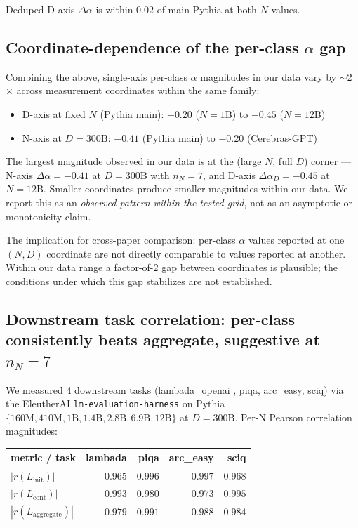 \documentclass[10pt]{article}
\newcommand{\dalpha}{\Delta\alpha}
\newcommand{\Linit}{L_\mathrm{init}}
\newcommand{\Lcont}{L_\mathrm{cont}}
\newcommand{\Lagg}{L_\mathrm{aggregate}}
\begin{document}
Deduped D-axis $\dalpha$ is within $0.02$ of main Pythia at both $N$
values.

\subsection{Coordinate-dependence of the per-class $\alpha$ gap}
\label{sec:coord}

Combining the above, single-axis per-class $\alpha$ magnitudes in our
data vary by $\sim$2$\times$ across measurement coordinates within
the same family:
\begin{itemize}
  \item D-axis at fixed $N$ (Pythia main): $-0.20$ ($N{=}1\text{B}$)
        to $-0.45$ ($N{=}12\text{B}$)
  \item N-axis at $D{=}300\text{B}$: $-0.41$ (Pythia main) to $-0.20$
        (Cerebras-GPT)
\end{itemize}
The largest magnitude observed in our data is at the (large $N$, full
$D$) corner --- N-axis $\dalpha = -0.41$ at $D{=}300\text{B}$ with
$n_N = 7$, and D-axis $\dalpha_D = -0.45$ at $N = 12\text{B}$.
Smaller coordinates produce smaller magnitudes within our data. We
report this as an \emph{observed pattern within the tested grid},
not as an asymptotic or monotonicity claim.

The implication for cross-paper comparison: per-class $\alpha$ values
reported at one $(N, D)$ coordinate are not directly comparable to
values reported at another. Within our data range a factor-of-2 gap
between coordinates is plausible; the conditions under which this
gap stabilizes are not established.

\subsection{Downstream task correlation: per-class consistently beats aggregate, suggestive at $n_N{=}7$}
\label{sec:downstream}

We measured 4 downstream tasks (lambada\_openai
\citep{paperno2016lambada}, piqa, arc\_easy, sciq) via the EleutherAI
\texttt{lm-evaluation-harness} \citep{gao2024lmeval} on Pythia
$\{160\text{M}, 410\text{M}, 1\text{B}, 1.4\text{B}, 2.8\text{B},
6.9\text{B}, 12\text{B}\}$ at $D{=}300\text{B}$. Per-N Pearson
correlation magnitudes:

\begin{center}
\small
\begin{tabular}{lrrrr}
\toprule
metric / task & lambada & piqa & arc\_easy & sciq \\
\midrule
$|r(\Linit)|$  & $0.965$ & $\mathbf{0.996}$ & $\mathbf{0.997}$ & $0.968$ \\
$|r(\Lcont)|$  & $\mathbf{0.993}$ & $0.980$ & $0.973$ & $\mathbf{0.995}$ \\
$|r(\Lagg)|$   & $0.979$ & $0.991$ & $0.988$ & $0.984$ \\
\bottomrule
\end{tabular}
\end{center}
\end{document}
